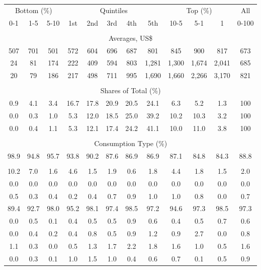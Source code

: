 \begin{tabular}{c c c| c c c c c| c c c| c}
\toprule
\multicolumn{3}{c|}{Bottom (\%)} & \multicolumn{5}{c|}{Quintiles} & \multicolumn{3}{c|}{Top (\%)} & All  \\
0-1 & 1-5 & 5-10 &  1st & 2nd & 3rd & 4th & 5th & 10-5 & 5-1 & 1 & 0-100 \\
\midrule \\
\multicolumn{12}{c}{Averages, US\$} \\
\midrule
507  & 701  & 501  & 572  & 604  & 696  & 687  & 801  & 845  & 900  & 817  & 673 \\
24 & 81 & 174 & 222 & 409 & 594 & 803 & 1,281 & 1,300 & 1,674 & 2,041 & 685 \\
20 & 79 & 186 & 217 & 498 & 711 & 995 & 1,690 & 1,660 & 2,266 & 3,170 & 821 \\
\midrule \\
\multicolumn{12}{c}{Shares of Total (\%)} \\
\midrule
0.9   & 4.1   & 3.4   & 16.7   & 17.8   & 20.9   & 20.5   & 24.1   & 6.3   & 5.2   & 1.3   & 100 \\
0.0  & 0.3  & 1.0  & 5.3  & 12.0  & 18.5  & 25.0  & 39.2  & 10.2  & 10.3  & 3.2  & 100 \\
0.0  & 0.4  & 1.1  & 5.3  & 12.1  & 17.4  & 24.2  & 41.1  & 10.0  & 11.0  & 3.8  & 100 \\
\midrule \\
\multicolumn{12}{c}{Consumption Type (\%)}  \\
\midrule
98.9 & 94.8 & 95.7 & 93.8 & 90.2 & 87.6 & 86.9 & 86.9 & 87.1 & 84.8 & 84.3 & 88.8 \\
 & & & & & & & & & & &  \\
10.2 & 7.0 & 1.6 & 4.6 & 1.5 & 1.9 & 0.6 & 1.8 & 4.4 & 1.8 & 1.5 & 2.0 \\
0.0 & 0.0 & 0.0 & 0.0 & 0.0 & 0.0 & 0.0 & 0.0 & 0.0 & 0.0 & 0.0 & 0.0 \\
0.5 & 0.3 & 0.4 & 0.2 & 0.4 & 0.7 & 0.9 & 1.0 & 1.0 & 0.8 & 0.0 & 0.7 \\
89.4 & 92.7 & 98.0 & 95.2 & 98.1 & 97.4 & 98.5 & 97.2 & 94.6 & 97.3 & 98.5 & 97.3 \\
0.0 & 0.5 & 0.1 & 0.4 & 0.5 & 0.5 & 0.9 & 0.6 & 0.4 & 0.5 & 0.7 & 0.6 \\
0.0 & 0.4 & 0.2 & 0.4 & 0.8 & 0.5 & 0.9 & 1.2 & 0.9 & 2.7 & 0.0 & 0.8 \\
1.1 & 0.3 & 0.0 & 0.5 & 1.3 & 1.7 & 2.2 & 1.8 & 1.6 & 1.0 & 0.5 & 1.6 \\
0.0 & 0.3 & 0.1 & 1.0 & 1.5 & 1.0 & 0.4 & 0.6 & 0.7 & 0.1 & 0.5 & 0.9 \\

\end{tabular}

